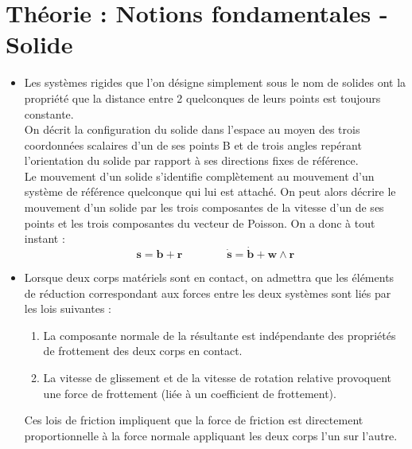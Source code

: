 \documentclass[a4paper]{article}
\begin{document}
\section{Théorie : Notions fondamentales - Solide}










\begin{itemize}





\item Les systèmes rigides que l'on désigne simplement sous le nom de solides ont la propriété que la distance entre 2 quelconques de leurs points est toujours constante. \\
On décrit la configuration du solide dans l'espace au moyen des trois coordonnées scalaires d'un de ses points B et de trois angles repérant l'orientation du solide par rapport à ses directions fixes de référence. \\
Le mouvement d'un solide s'identifie complètement au mouvement d'un système de référence quelconque qui lui est attaché. On peut alors décrire le mouvement d'un solide par les trois composantes de la vitesse d'un de ses points et les trois composantes du vecteur de Poisson. On a donc à tout instant : 
\[ \textbf{s} = \textbf{b} + \textbf{r} \qquad \qquad \dot{\textbf{s}} = \dot{\textbf{b}} + \textbf{w} \wedge \textbf{r} \]





\item Lorsque deux corps matériels sont en contact, on admettra que les éléments de réduction correspondant aux forces entre les deux systèmes sont liés par les lois suivantes : 
\begin{enumerate}
\item La composante normale de la résultante est indépendante des propriétés de frottement des deux corps en contact.
\item La vitesse de glissement et de la vitesse de rotation relative provoquent une force de frottement (liée à un coefficient de frottement).
\end{enumerate}
Ces lois de friction impliquent que la force de friction est directement proportionnelle à la force normale appliquant les deux corps l'un sur l'autre.






\end{itemize}
\end{document}

